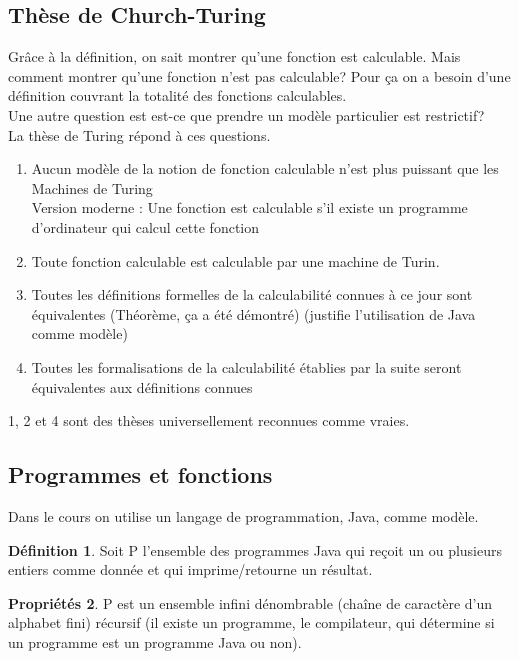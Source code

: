 \documentclass[11pt,a4paper]{article}
\theoremstyle{definition}
\newtheorem{mydef}{Définition}
\newtheorem{myprop}[mydef]{Propriétés}
\begin{document}
\subsection{Thèse de Church-Turing}
\label{sub:th_se_de_church_turing}
Grâce à la définition, on sait montrer qu'une fonction est calculable. Mais comment
montrer qu'une fonction n'est pas calculable? Pour ça on a besoin d'une définition
couvrant la totalité des fonctions calculables. \\
Une autre question est est-ce que prendre un modèle particulier est restrictif?\\
La thèse de Turing répond à ces questions.
\begin{enumerate}
	\item Aucun modèle de la notion de fonction calculable n'est plus puissant
		que les Machines de Turing \\
		Version moderne : Une fonction est calculable s'il existe un 
		programme d'ordinateur qui calcul cette fonction
	\item Toute fonction calculable est calculable par une machine de Turin.
	\item Toutes les définitions formelles de la calculabilité connues à ce 
		jour sont équivalentes (Théorème, ça a été démontré) (justifie 
		l'utilisation de Java comme modèle)
	\item Toutes les formalisations de la calculabilité établies par la 
		suite seront équivalentes aux définitions connues
\end{enumerate}
1, 2 et 4 sont des thèses universellement reconnues comme vraies.


\subsection{Programmes et fonctions}
\label{sub:programmes_et_fonctions}
Dans le cours on utilise un langage de programmation, Java, comme modèle.

\begin{mydef}
	Soit P l'ensemble des programmes Java qui reçoit un ou plusieurs entiers comme 
	donnée et qui imprime/retourne un résultat.
\end{mydef}

\begin{myprop}
	P est un ensemble infini dénombrable (chaîne de caractère d'un 
	alphabet fini) récursif (il existe un programme, le compilateur, qui détermine 
	si un programme est un programme Java ou non).
\end{myprop}
\end{document}
